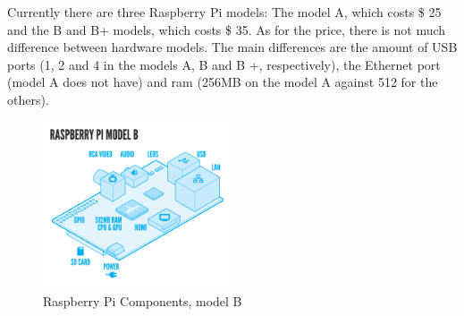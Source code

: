 \documentclass{acm_proc_article-sp}
\begin{document}
\newline
\newline
Currently there are three  Raspberry Pi models: The model A, which costs \$ 25 and the B and B+ models, which costs \$ 35. As for the price, there is not much difference between hardware models. The main differences are the amount of USB ports (1, 2 and 4 in the models A, B and B +, respectively), the Ethernet port (model A does not have) and ram (256MB on the model A against 512 for the others).
\begin{figure}[h]
\centering
    \includegraphics[width=0.5\textwidth,natwidth=610,natheight=642]{pictures/RaspiModelB.png}
    \caption{Raspberry Pi Components, model B\protect\cite{raspberryFaq}}
    \label{fig:raspi}
\end{figure}
\end{document}
